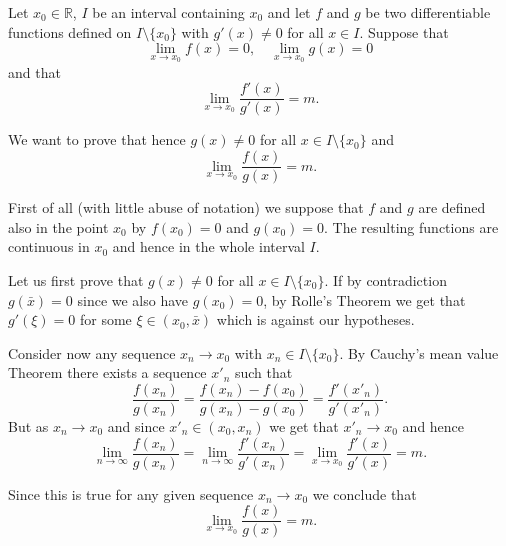 \documentclass[12pt]{article}
\newcommand{\R}{\mathbb R}
\begin{document}
Let $x_0\in \R$, $I$ be an interval containing $x_0$ and let $f$ and $g$ be two differentiable functions defined on $I\setminus\{x_0\}$ with $g'(x)\neq 0$ for all $x\in I$. Suppose that
\[
\lim_{x\to x_0} f(x) = 0, \quad \lim_{x\to x_0} g(x)=0
\]
and that
\[
   \lim_{x\to x_0} \frac{f'(x)}{g'(x)}=m.
\]

We want to prove that hence $g(x)\neq 0$ for all $x\in I\setminus\{x_0\}$ and
\[
  \lim_{x\to x_0} \frac{f(x)}{g(x)}=m.
\]

First of all (with little abuse of notation) we suppose that $f$ and $g$ are defined also in the point $x_0$ by $f(x_0)=0$ and $g(x_0)=0$. The resulting functions are continuous in $x_0$ and hence in the whole interval $I$. 

Let us first prove that $g(x)\neq 0$ for all $x\in I\setminus\{x_0\}$. If by contradiction $g(\bar x)=0$ since we also have $g(x_0)=0$, by Rolle's Theorem we get that $g'(\xi)=0$ for some $\xi\in (x_0,\bar x)$ which is against our hypotheses.

Consider now any sequence $x_n\to x_0$ with $x_n\in I\setminus\{x_0\}$.
By Cauchy's mean value Theorem there exists a sequence $x'_n$ such that
\[
  \frac{f(x_n)}{g(x_n)} = \frac{f(x_n)-f(x_0)}{g(x_n)-g(x_0)}
  = \frac{f'(x'_n)}{g'(x'_n)}.
\]
But as $x_n\to x_0$ and since $x'_n \in (x_0,x_n)$ we get that $x'_n\to x_0$ and hence
\[
  \lim_{n\to\infty} \frac{f(x_n)}{g(x_n)} 
  = \lim_{n\to\infty} \frac{f'(x_n)}{g'(x_n)}
  = \lim_{x\to x_0} \frac{f'(x)}{g'(x)} = m.
\]

Since this is true for any given sequence $x_n\to x_0$ we conclude that
\[
  \lim_{x\to x_0} \frac{f(x)}{g(x)} = m.
\]
\end{document}
